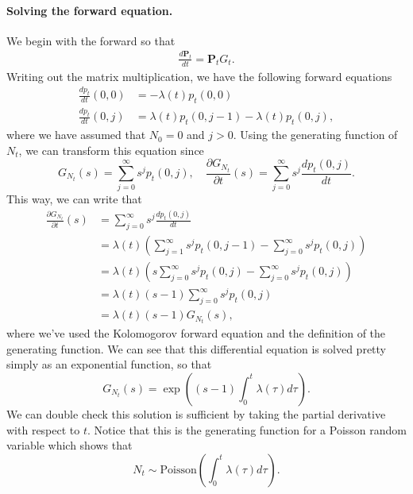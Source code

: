 \documentclass[12pt]{article}
\let\vec\mathbf
\theoremstyle{definition}
\theoremstyle{remark}
\begin{document}
\paragraph{Solving the forward equation.}
\label{par:solving_the_forward_equation_}
We begin with the forward so that
\begin{align*}
    \frac{d \vec{P}_{t}}{dt} = \vec{P}_{t} G_{t} .
\end{align*}
Writing out the matrix multiplication, we have the following forward equations
\begin{align*}
    \frac{dp_{t}}{dt}(0, 0) &= -\lambda(t) p_{t}(0,0)\\
    \frac{dp_{t}}{dt}(0, j) &= \lambda(t) p_{t}(0, j - 1) - \lambda(t) p_{t}(0,j), 
\end{align*}
where we have assumed that $N_{0} = 0$ and $j>0$. Using the generating function of $N_{t}$, we can transform this equation since
\begin{equation*}
    G_{N_{t}}(s) = \sum_{j=0}^{\infty} s^{j} p_{t}(0, j), 
    \quad 
    \frac{\partial G_{N_{t}}}{\partial t}(s)  = \sum_{j=0}^{\infty} s^{j} \frac{dp_{t}(0, j)}{dt}.
\end{equation*}
This way, we can write that
\begin{align*}
    \frac{\partial G_{N_{t}}}{\partial t}(s)  
    &= \sum_{j=0}^{\infty} s^{j} \frac{dp_{t}(0, j)}{dt}\\
    &= \lambda(t) \left( \sum_{j=1}^{\infty} s^{j} p_{t}(0, j - 1) - \sum_{j=0}^{\infty} s^{j} p_{t}(0, j)\right)\\
    &= \lambda(t) \left( s\sum_{j=0}^{\infty} s^{j} p_{t}(0, j) - \sum_{j=0}^{\infty} s^{j} p_{t}(0, j)\right)\\
    &= \lambda(t) (s - 1) \sum_{j=0}^{\infty} s^{j} p_{t}(0, j) \\
    &= \lambda(t) (s - 1) G_{N_{t}}(s),
\end{align*}
where we've used the Kolomogorov forward equation and the definition of the generating function. We can see that this differential equation is solved pretty simply as an exponential function, so that
\begin{equation*}
    G_{N_{t}}(s) = \exp \left( (s-1)\int_{0}^{t} \lambda(\tau) d\tau  \right).
\end{equation*}
We can double check this solution is sufficient by taking the partial derivative with respect to $t$. Notice that this is the  generating function for a Poisson random variable which shows that
\begin{equation*}
    N_{t} \sim \text{Poisson}\left( \int_{0}^{t} \lambda(\tau) d\tau \right).
\end{equation*}
\end{document}
